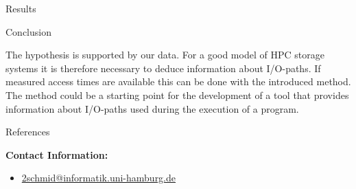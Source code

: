 \documentclass[final]{beamer}
\newlength{\onecolwid}
\begin{document}
\begin{frame}[t]
\begin{columns}[t]
\begin{column}{\onecolwid}
\begin{block}{Results}
\end{block}


\vspace*{-2.1cm}
\begin{block}{Conclusion}

	The hypothesis is supported by our data.
	For a good model of HPC storage systems it is therefore necessary to deduce information about I/O-paths.
	If measured access times are available this can be done with the introduced method.\\
	The method could be a starting point for the development of a tool that provides information about I/O-paths used during the execution of a program.
	
	

\end{block}


\vspace*{-0.5cm}
\begin{block}{References}

\nocite{*} %
\tiny{
\vspace{0.75in}}

\end{block}

	\footnotesize
	
	\vspace*{-2.4cm}
	\begin{exampleblock}{}
		\vspace*{-1cm}
		\textbf{Contact Information:}
		\vspace*{-0.4cm}
		\begin{itemize}
			\item \href{mailto:2schmid@informatik.uni-hamburg.de}{2schmid@informatik.uni-hamburg.de}
		\end{itemize}
		

\end{exampleblock}
\end{column}
\end{columns}
\end{frame}
\end{document}
